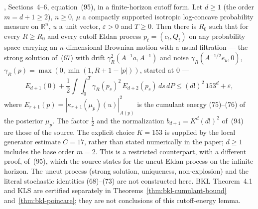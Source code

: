 \begin{lemma}
  \label{lem:bkl-cutoff-energy}
  \leanok
  \cite{BizeulKlartagLehec2026}, Sections~4--6, equation~(95), in a finite-horizon cutoff form. Let $d\ge1$ (the
  order $m=d+1\ge2$), $n\ge0$, $\mu$ a compactly supported isotropic log-concave probability measure on $\mathbb R^n$,
  $u$ a unit vector, $\varepsilon>0$ and $T\ge0$. Then there is $R_0$ such that for every $R\ge R_0$ and every cutoff
  Eldan process $p_t=(c_t,Q_t)$ on any probability space carrying an $n$-dimensional Brownian motion with a usual
  filtration --- the strong solution of~(67) with drift $\gamma_R^2(A^{-1}a,A^{-1})$ and noise
  $\gamma_R(A^{-1/2}e_k,0)$, $\gamma_R(p)=\max(0,\min(1,R+1-|p|))$, started at $0$ ---
  \[
    E_{d+1}(0)+\frac12\int\!\!\int_0^T\gamma_R(p_s)^2\,E_{d+2}(p_s)\,ds\,dP\le(d!)^2\,153^d+\varepsilon,
  \]
  where $E_{r+1}(p)=|\kappa_{r+1}(\mu_p)(u)|^2_{A(p)}$ is the cumulant energy (75)--(76) of the posterior $\mu_p$.
  The factor $\frac12$ and the normalization $b_{d+1}=K^d(d!)^2$ of~(94) are those of the
  source. The explicit choice $K=153$ is supplied by the local generator estimate $C=17$, rather
  than stated numerically in the paper; $d\ge1$ includes the base order $m=2$.
  This is a restricted counterpart, with a different proof, of~(95), which
  the source states for the uncut Eldan process on the infinite horizon. The uncut process (strong solution,
  uniqueness, non-explosion) and the literal stochastic identities (68)--(73) are not constructed here. BKL
  Theorem~4.1 and KLS are certified separately in Theorems~\ref{thm:bkl-cumulant-bound} and~\ref{thm:bkl-poincare}; they are not conclusions of this cutoff-energy lemma.
\end{lemma}
